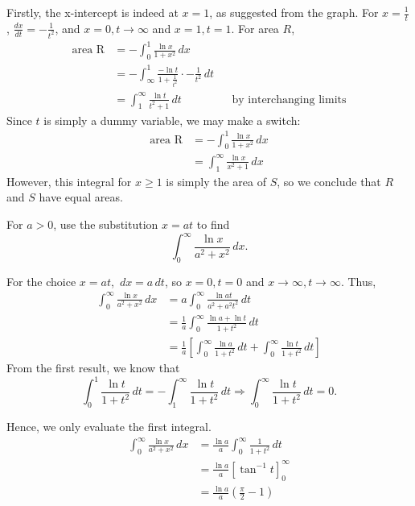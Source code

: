 \documentclass[../jarvis.tex]{subfiles}
\begin{document}
Firstly, the x-intercept is indeed at $x=1$, as suggested from the graph. For  $x=\frac{1}{t}$, $\frac{dx}{dt}=-\frac{1}{t^2}$, and $x=0, t\to \infty$ and $x=1, t=1$. For area $R$, 
\begin{align*}
    \text{area R} &= -\int_0^{1}\frac{\ln{x}}{1+x^2}\,dx \\
    &=-\int_{\infty}^{1}\frac{-\ln{t}}{1+\frac{1}{t^2}} \cdot -\frac{1}{t^2}\,dt\\
    &=\int_{1}^{\infty}\frac{\ln{t}}{t^2+1} \,dt &&\text{by interchanging limits}
\end{align*}
Since $t$ is simply a dummy variable, we may make a switch:
\begin{align*}
    \text{area R} &= -\int_0^{1}\frac{\ln{x}}{1+x^2}\,dx \\
    &=\int_{1}^{\infty}\frac{\ln{x}}{x^2+1} \,dx
\end{align*}
However, this integral for $x\geq 1$ is simply the area of $S$, so we conclude that $R$ and $S$ have equal areas.

\begin{example}[cont.]\label{0.2-subst}
For $a > 0$, use the substitution $x=at$ to find $$\int_{0}^{\infty}\frac{\ln{x}}{a^2+x^2} \,dx.$$
\end{example}
For the choice $x=at$, $\,dx=a\,dt$, so $x=0,t=0$ and $x \to \infty, t\to\infty$.
Thus,
\begin{align*}
    \int_{0}^{\infty}\frac{\ln{x}}{a^2+x^2} \,dx &= a\int_{0}^{\infty}\frac{\ln{at}}{a^2+a^2t^2} \,dt \\
    &= \frac{1}{a}\int_{0}^{\infty}\frac{\ln{a}+\ln{t}}{1+t^2} \,dt \\
    &= \frac{1}{a}\left[\int_{0}^{\infty}\frac{\ln{a}}{1+t^2}\,dt+\int_{0}^{\infty}\frac{\ln{t}}{1+t^2} \,dt\right]
\end{align*}
From the first result, we know that $$\int_{0}^{1}\frac{\ln{t}}{1+t^2} \,dt=-\int_{1}^{\infty}\frac{\ln{t}}{1+t^2} \,dt \Longrightarrow \int_{0}^{\infty}\frac{\ln{t}}{1+t^2} \,dt=0.$$

Hence, we only evaluate the first integral.
\begin{align*}
    \int_{0}^{\infty}\frac{\ln{x}}{a^2+x^2} \,dx
    &= \frac{\ln{a}}{a}\int_{0}^{\infty}\frac{1}{1+t^2}\,dt \\
    &= \frac{\ln{a}}{a}\left[\tan^{-1}{t}\right]_{0}^{\infty} \\
    &= \frac{\ln{a}}{a}\left(\frac{\pi}{2}-1\right)
\end{align*}
\end{document}
